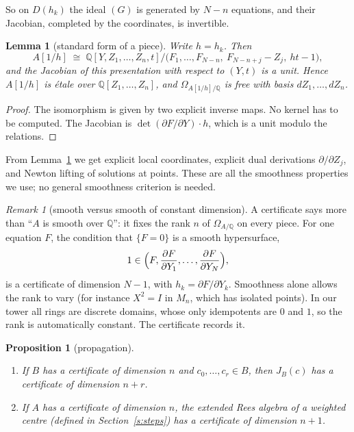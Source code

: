 \documentclass[11pt]{article}
\newcommand{\Q}{\mathbb{Q}}
\numberwithin{equation}{section}
\theoremstyle{plain}
\newtheorem{proposition}[theorem]{Proposition}
\newtheorem{lemma}[theorem]{Lemma}
\theoremstyle{definition}
\theoremstyle{remark}
\newtheorem*{remark}{Remark}
\begin{document}
So on $D(h_k)$ the ideal $(G)$ is generated by $N-n$ equations, and their Jacobian, completed by
the coordinates, is invertible.

\begin{lemma}[standard form of a piece]\label{l:etale}
Write $h=h_k$. Then
\[
A[1/h]\;\cong\;\Q[Y,Z_1,\dots,Z_n,t]\big/\bigl(F_1,\dots,F_{N-n},\ F_{N-n+j}-Z_j,\ ht-1\bigr),
\]
and the Jacobian of this presentation with respect to $(Y,t)$ is a unit. Hence $A[1/h]$ is étale
over $\Q[Z_1,\dots,Z_n]$, and $\Omega_{A[1/h]/\Q}$ is free with basis $dZ_1,\dots,dZ_n$.
\end{lemma}

\begin{proof}
The isomorphism is given by two explicit inverse maps. No kernel has to be computed. The Jacobian
is $\det(\partial F/\partial Y)\cdot h$, which is a unit modulo the relations.
\end{proof}

From Lemma~\ref{l:etale} we get explicit local coordinates, explicit dual derivations
$\partial/\partial Z_j$, and Newton lifting of solutions at points. These are all the smoothness
properties we use; no general smoothness criterion is needed.

\begin{remark}[smooth versus smooth of constant dimension]
A certificate says more than ``$A$ is smooth over $\Q$'': it fixes the rank $n$ of
$\Omega_{A/\Q}$ on every piece. For one equation $F$, the condition that $\{F=0\}$ is a smooth
hypersurface,
\[
1\in\Bigl(F,\frac{\partial F}{\partial Y_1},\dots,\frac{\partial F}{\partial Y_N}\Bigr),
\]
is a certificate of dimension $N-1$, with $h_k=\partial F/\partial Y_k$. Smoothness alone allows
the rank to vary (for instance $X^2=I$ in $M_n$, which has isolated points). In our tower all rings
are discrete domains, whose only idempotents are $0$ and $1$, so the rank is automatically
constant. The certificate records it.
\end{remark}

\begin{proposition}[propagation]\label{p:prop}
\begin{enumerate}
\item If $B$ has a certificate of dimension $n$ and $c_0,\dots,c_r\in B$, then $J_B(c)$ has a certificate of dimension $n+r$.
\item If $A$ has a certificate of dimension $n$, the extended Rees algebra of a weighted centre
  (defined in Section~\ref{s:steps}) has a certificate of dimension $n+1$.
\end{enumerate}
\end{proposition}
\end{document}
